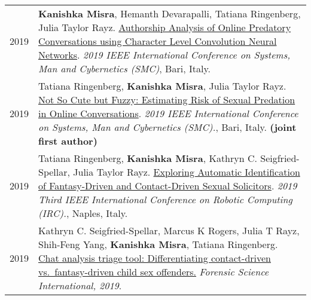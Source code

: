 \documentclass[11pt]{article}
\newcommand{\link}[1]{[\href{#1}{\texttt{link}}]}
\begin{document}
\begin{longtable}{p{}  p{} }
2019 & \textbf{Kanishka Misra}, Hemanth Devarapalli, Tatiana Ringenberg, Julia Taylor Rayz. \href{https://doi.org/10.1109/SMC.2019.8914323}{Authorship Analysis of Online Predatory Conversations using Character Level Convolution Neural Networks}. \textit{2019 IEEE International Conference on Systems, Man and Cybernetics (SMC)}, Bari, Italy.\\

2019 & Tatiana Ringenberg, \textbf{Kanishka Misra}, Julia Taylor Rayz. \href{https://doi.org/10.1109/SMC.2019.8914528}{Not So Cute but Fuzzy: Estimating Risk of Sexual Predation in Online Conversations}. \textit{2019 IEEE International Conference on Systems, Man and Cybernetics (SMC).}, Bari, Italy. \textbf{(joint first author)}\\



2019 & Tatiana Ringenberg, \textbf{Kanishka Misra}, Kathryn C. Seigfried-Spellar, Julia Taylor Rayz. \href{https://doi.org/10.1109/IRC.2019.00110}{Exploring Automatic Identification of Fantasy-Driven and Contact-Driven Sexual Solicitors}. \textit{2019 Third IEEE International Conference on Robotic Computing (IRC).}, Naples, Italy.\\

2019 & Kathryn C. Seigfried-Spellar, Marcus K Rogers, Julia T Rayz, Shih-Feng Yang, \textbf{Kanishka Misra}, Tatiana Ringenberg. \href{https://doi.org/https://doi.org/10.1016/j.forsciint.2019.02.028}{Chat analysis triage tool: Differentiating contact-driven vs.~fantasy-driven child sex offenders.} \textit{Forensic Science International, 2019}.
\end{longtable}
\end{document}
